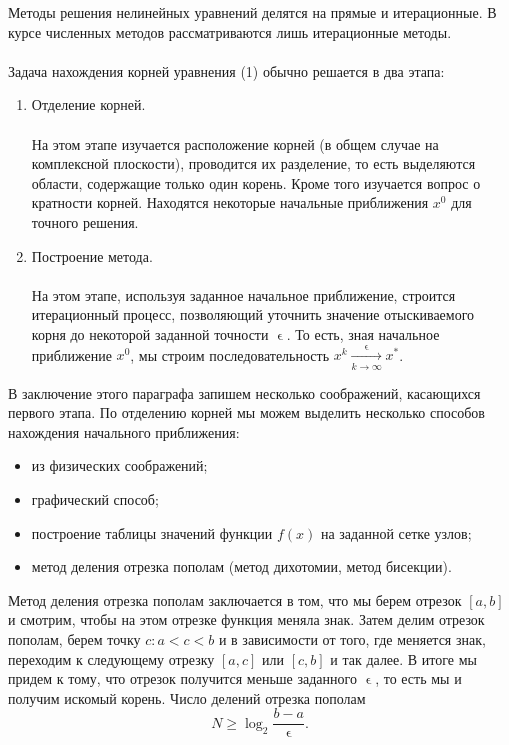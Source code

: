 \documentclass[a4paper, 12pt]{report}
\renewcommand{\geq}{\geqslant}
\renewcommand{\epsilon}{\upvarepsilon}
\begin{document}
	Методы решения нелинейных уравнений делятся на прямые и итерационные. В курсе численных методов рассматриваются лишь итерационные методы. \\\\
	Задача нахождения корней уравнения (1) обычно решается в два этапа:
	\begin{enumerate}
		\item Отделение корней.\\\\
		На этом этапе изучается расположение корней (в общем случае на комплексной плоскости), проводится их разделение, то есть выделяются области, содержащие только один корень. Кроме того изучается вопрос о кратности корней. Находятся некоторые начальные приближения $x^0$ для точного решения.
		\item Построение метода.
		\\\\
		На этом этапе, используя заданное начальное приближение, строится итерационный процесс, позволяющий уточнить значение отыскиваемого корня до некоторой заданной точности $\epsilon$. То есть, зная начальное приближение $x^0$, мы строим последовательность $x^k \xrightarrow[k\to\infty]{\epsilon}x^*$.
	\end{enumerate}
	В заключение этого параграфа запишем несколько соображений, касающихся первого этапа. По отделению корней мы можем выделить несколько способов нахождения начального приближения:
	\begin{itemize}
		\item из физических соображений;
		\item графический способ;
		\item построение таблицы значений функции $f(x)$ на заданной сетке узлов;
		\item метод деления отрезка пополам (метод дихотомии, метод бисекции).
	\end{itemize}
	Метод деления отрезка пополам заключается в том, что мы берем отрезок $[a,b]$ и смотрим, чтобы на этом отрезке функция меняла знак. Затем делим отрезок пополам, берем точку $c : a<c<b$ и в зависимости от того, где меняется знак, переходим к следующему отрезку $[a,c]$ или $[c,b]$ и так далее. В итоге мы придем к тому, что отрезок получится меньше заданного $\epsilon$, то есть мы и получим искомый корень. Число делений отрезка пополам $$N \geq \log_2 \dfrac{b-a}{\epsilon}.$$
\end{document}
